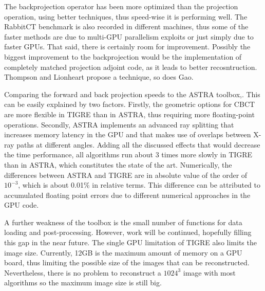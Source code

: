 The backprojection operator has been more optimized than the projection operation, using better techniques, thus speed-wise it is performing well. \color{black}{} The RabbitCT benchmark is also recorded in different machines, thus some of the faster methods are due to multi-GPU parallelism exploits or just simply due to faster GPUs. That said, there is certainly room for improvement. 
Possibly the biggest improvement to the backprojection  would be the implementation of completely matched projection adjoint code, as it leads to better recosntruction\cite{6829349}. Thompson and Lionheart\cite{thompson2014gpu} propose a technique, so does Gao\cite{gao2012fast}.

Comparing the forward and back projection speeds to the ASTRA toolbox\cite{ASTRA},\color{red}{ TIGRE is 2 times slower at its worst}\color{black}{}. This can be easily explained by two factors. Firstly, the geometric options for CBCT are more flexible in TIGRE than in ASTRA, thus requiring more floating-point operations. Secondly, ASTRA implements an advanced ray splitting that increases memory latency in the GPU and that makes use of overlaps between X-ray paths at different angles\cite{Palenstijn2011250}. Adding all the discussed effects that would decrease the time performance, all algorithms run about 3 times more slowly in TIGRE than in ASTRA, which constitutes the state of the art. {Numerically, the differences between ASTRA and TIGRE are in absolute value of the order of $10^{-3}$, which is about 0.01\% in relative terms. This difference can be attributed to accumulated floating point errors due to different numerical approaches in the GPU code.}

 \color{red}{To speed up further the toolbox, a multi-GPU approach could also be taken. Currently, TIGRE does not support multi-GPU architectures.} \color{black}{} A further weakness of the toolbox is the small number of functions for data loading and post-processing. However, work will be continued, hopefully filling this gap in the near future. The single GPU limitation of TIGRE also limits the image size. Currently, 12GB is the maximum amount of memory on a GPU board, thus limiting the possible size of the images that can be reconstructed. Nevertheless, there is no problem to reconstruct a $1024^3$ image with most algorithms so the maximum image size is still big.


